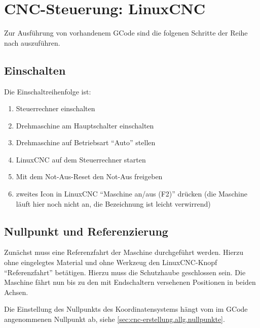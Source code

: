 \documentclass{\basedir/fablab-document}
\begin{document}
\section{CNC-Steuerung: LinuxCNC}

Zur Ausführung von vorhandenem GCode sind die folgenen Schritte der Reihe nach auszuführen.

\subsection{Einschalten}
Die Einschaltreihenfolge ist:
\begin{enumerate}
	\item Steuerrechner einschalten
	\item Drehmaschine am Hauptschalter einschalten
	\item Drehmaschine auf Betriebsart \enquote{Auto} stellen
	\item LinuxCNC auf dem Steuerrechner starten
	\item Mit dem Not-Aus-Reset den Not-Aus freigeben
	\item zweites Icon in LinuxCNC "`Maschine an/aus (F2)"' drücken (die Maschine läuft hier noch nicht an, die Bezeichnung ist leicht verwirrend)
\end{enumerate}

\subsection{Nullpunkt und Referenzierung}

Zunächst muss eine Referenzfahrt der Maschine durchgeführt werden. Hierzu ohne eingelegtes Material und ohne Werkzeug den LinuxCNC-Knopf \enquote{Referenzfahrt} betätigen. Hierzu muss die Schutzhaube geschlossen sein. Die Maschine fährt nun bis zu den mit Endschaltern versehenen Positionen in beiden Achsen.

Die Einstellung des Nullpunkts des Koordinatensystems hängt vom im GCode angenommenen Nullpunkt ab, siehe \ref{sec:cnc-erstellung.allg.nullpunkte}.
\end{document}
